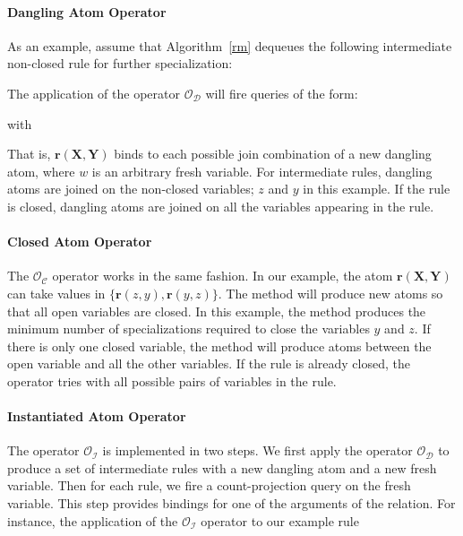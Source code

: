 \paragraph{Dangling Atom Operator}
As an example, assume that Algorithm~\ref{rm} dequeues the following intermediate non-closed rule for further specialization:


\noindent
The application of the operator $\mathcal{O_D}$ will fire queries of the form:


\noindent with

\noindent That is, $\bm{r}(\bm{X}, \bm{Y})$ binds to each possible join combination of a new dangling atom,
where $w$ is an arbitrary fresh variable. For intermediate rules, dangling atoms are joined on the non-closed variables;
$z$ and $y$ in this example.
If the rule is closed, dangling atoms are joined on all the variables appearing in the rule.

\paragraph{Closed Atom Operator} The $\mathcal{O_C}$ operator works in the same fashion. In our example, the atom $\bm{r}(\bm{X}, \bm{Y})$
can take values in $\{ \bm{r}(z,y), \bm{r}(y,z) \}$. The method will produce new atoms so that all open variables are closed. In this example, the method produces the minimum number
of specializations required to close the variables $y$ and $z$. If there is only one closed variable, the method will produce atoms between
the open variable and all the other variables. If the rule is already closed, the operator tries with
all possible pairs of variables in the rule.

\paragraph{Instantiated Atom Operator} The operator $\mathcal{O_I}$ is implemented in two steps.
We first apply the operator $\mathcal{O_D}$ to produce a set of intermediate rules
with a new dangling atom and a new fresh variable.
Then for each rule, we fire a count-projection query on the fresh variable.
This step provides bindings for one of the arguments of the relation.
For instance, the application of the $\mathcal{O_I}$ operator to our example
rule

